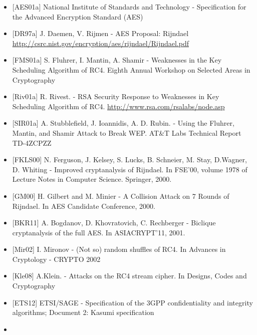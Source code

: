 \documentclass[a4paper]{article}
\begin{document}
\begin{multicols}{3}
    \begin{itemize}
        \item
              {[}AES01a{]} National Institute of Standards and Technology -
              Specification for the Advanced Encryption Standard (AES)
        \item
              {[}DR97a{]} J. Daemen, V. Rijmen - AES Proposal: Rijndael
              \href{http://csrc.nist.gov/encryption/aes/rijndael/Rijndael.pdf}{http://csrc.nist.gov/encryption/aes/rijndael/Rijndael.pdf}
        \item
              {[}FMS01a{]} S. Fluhrer, I. Mantin, A. Shamir - Weaknesses in the Key
              Scheduling Algorithm of RC4. Eighth Annual Workshop on Selected Areas
              in Cryptography
        \item
              {[}Riv01a{]} R. Rivest. - RSA Security Response to Weaknesses in Key
              Scheduling Algorithm of RC4.
              \href{http://www.rsa.com/rsalabs/node.asp}{http://www.rsa.com/rsalabs/node.asp}
        \item
              {[}SIR01a{]} A. Stubblefield, J. Ioannidis, A. D. Rubin. - Using the
              Fluhrer, Mantin, and Shamir Attack to Break WEP. AT\&T Labs Technical
              Report TD-4ZCPZZ
        \item
              {[}FKLS00{]} N. Ferguson, J. Kelsey, S. Lucks, B. Schneier, M. Stay,
              D.Wagner, D. Whiting - Improved cryptanalysis of Rijndael. In FSE'00,
              volume 1978 of Lecture Notes in Computer Science. Springer, 2000.
        \item
              {[}GM00{]} H. Gilbert and M. Minier - A Collision Attack on 7 Rounds
              of Rijndael. In AES Candidate Conference, 2000.
        \item
              {[}BKR11{]} A. Bogdanov, D. Khovratovich, C. Rechberger - Biclique
              cryptanalysis of the full AES. In ASIACRYPT'11, 2001.
        \item
              {[}Mir02{]} I. Mironov - (Not so) random shuffles of RC4. In Advances
              in Cryptology - CRYPTO 2002
        \item
              {[}Kle08{]} A.Klein. - Attacks on the RC4 stream cipher. In Designs,
              Codes and Cryptography
        \item
              {[}ETS12{]} ETSI/SAGE - Specification of the 3GPP confidentiality and
              integrity algorithms; Document 2: Kasumi specification
        \item

\end{itemize}
\end{multicols}
\end{document}
